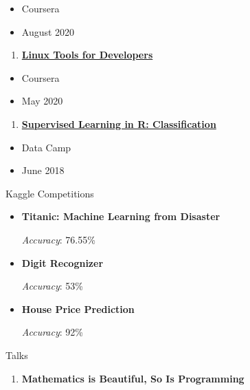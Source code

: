 \documentclass[
]{book}
\providecommand{\tightlist}{%
  \setlength{\itemsep}{0pt}\setlength{\parskip}{0pt}}
\begin{document}
\begin{itemize}
\tightlist
\item
  Coursera
\item
  August 2020
\end{itemize}

\begin{enumerate}
\def\labelenumi{\arabic{enumi}.}
\setcounter{enumi}{1}
\tightlist
\item
  \href{https://www.coursera.org/learn/linux-tools-for-developers/home/welcome}{\textbf{Linux Tools for Developers}}
\end{enumerate}

\begin{itemize}
\tightlist
\item
  Coursera
\item
  May 2020
\end{itemize}

\begin{enumerate}
\def\labelenumi{\arabic{enumi}.}
\setcounter{enumi}{2}
\tightlist
\item
  \href{https://www.datacamp.com/courses/supervised-learning-in-r-classification}{\textbf{Supervised Learning in R: Classification}}
\end{enumerate}

\begin{itemize}
\tightlist
\item
  Data Camp
\item
  June 2018
\end{itemize}

Kaggle Competitions

\begin{itemize}
\item
  \textbf{Titanic: Machine Learning from Disaster}

  \emph{Accuracy}: 76.55\%
\item
  \textbf{Digit Recognizer}

  \emph{Accuracy}: 53\%
\item
  \textbf{House Price Prediction}

  \emph{Accuracy}: 92\%
\end{itemize}

Talks

\begin{enumerate}
\def\labelenumi{\arabic{enumi}.}
\tightlist
\item
  \textbf{Mathematics is Beautiful, So Is Programming}
\end{enumerate}
\end{document}

